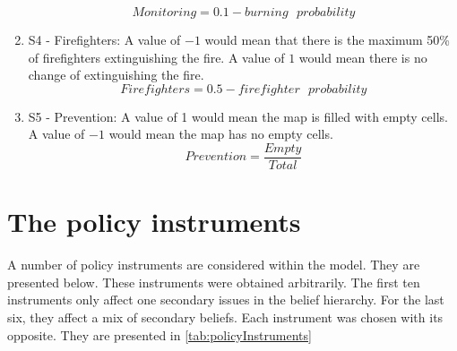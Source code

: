 \begin{enumerate}
	\begin{equation}
	Monitoring = 0.1 - burning \text{ } probability
	\end{equation}
\item S4 - Firefighters: A value of $-1$ would mean that there is the maximum 50\% of firefighters extinguishing the fire. A value of $1$ would mean there is no change of extinguishing the fire.
	\begin{equation}
	Firefighters = 0.5 - firefighter \text{ } probability
	\end{equation}
\item S5 - Prevention: A value of 1 would mean the map is filled with empty cells. A value of $-1$ would mean the map has no empty cells.
	\begin{equation}
	Prevention = \frac{Empty}{Total}
	\end{equation}
\end{enumerate}

%
\section{The policy instruments}

A number of policy instruments are considered within the model. They are presented below. These instruments were obtained arbitrarily. The first ten instruments only affect one secondary issues in the belief hierarchy. For the last six, they affect a mix of secondary beliefs. Each instrument was chosen with its opposite. They are presented in \autoref{tab:policyInstruments}

